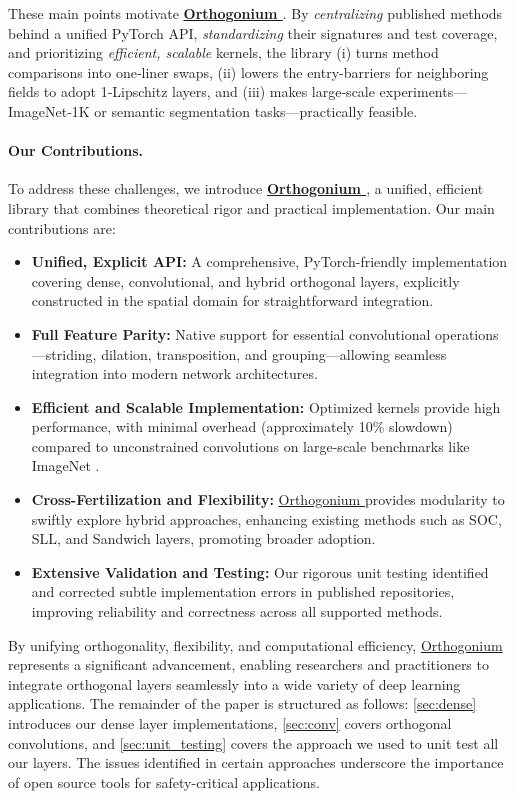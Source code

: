 \documentclass[10pt]{article}
\theoremstyle{plain}
\theoremstyle{definition}
\theoremstyle{remark}
\newcommand{\Orthogonium}{ \href{https://github.com/deel-ai/orthogonium/}{Orthogonium }}
\begin{document}
    These main points motivate \textbf{\Orthogonium}. By \textit{centralizing} published methods behind a unified PyTorch API, \textit{standardizing} their signatures and test coverage, and prioritizing \textit{efficient, scalable} kernels, the library (i) turns method comparisons into one‑liner swaps, (ii) lowers the entry-barriers for neighboring fields to adopt 1‑Lipschitz layers, and (iii) makes large‑scale experiments—ImageNet‑1K or semantic segmentation tasks—practically feasible.
    
    \paragraph{Our Contributions.}
    To address these challenges, we introduce \textbf{\Orthogonium}, a unified, efficient library that combines theoretical rigor and practical implementation. Our main contributions are:
    \begin{itemize}
    \item \textbf{Unified, Explicit API:} A comprehensive, PyTorch-friendly implementation covering dense, convolutional, and hybrid orthogonal layers, explicitly constructed in the spatial domain for straightforward integration.
    \item \textbf{Full Feature Parity:} Native support for essential convolutional operations—striding, dilation, transposition, and grouping—allowing seamless integration into modern network architectures.
    \item \textbf{Efficient and Scalable Implementation:} Optimized kernels provide high performance, with minimal overhead (approximately 10\% slowdown) compared to unconstrained convolutions on large-scale benchmarks like ImageNet \cite{deng2009imagenet}.
    \item \textbf{Cross-Fertilization and Flexibility:} \Orthogonium provides modularity to swiftly explore hybrid approaches, enhancing existing methods such as SOC, SLL, and Sandwich layers, promoting broader adoption.
    \item \textbf{Extensive Validation and Testing:} Our rigorous unit testing identified and corrected subtle implementation errors in published repositories, improving reliability and correctness across all supported methods.
    \end{itemize}
    
    By unifying orthogonality, flexibility, and computational efficiency, \Orthogonium represents a significant advancement, enabling researchers and practitioners to integrate orthogonal layers seamlessly into a wide variety of deep learning applications. The remainder of the paper is structured as follows: \cref{sec:dense} introduces our dense layer implementations, \cref{sec:conv} covers orthogonal convolutions, and \cref{sec:unit_testing} covers the approach we used to unit test all our layers. The issues identified in certain approaches underscore the importance of open source tools for safety-critical applications.
    
\end{document}
